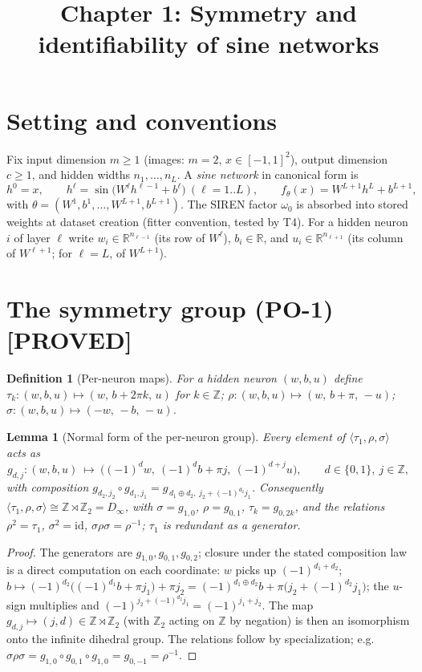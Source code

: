 \documentclass[11pt]{article}
\title{Chapter 1: Symmetry and identifiability of sine networks}
\newtheorem{lemma}[theorem]{Lemma}
\newtheorem{definition}[theorem]{Definition}
\newcommand{\R}{\mathbb{R}}
\newcommand{\Z}{\mathbb{Z}}
\newcommand{\Dinf}{D_\infty}
\begin{document}
\maketitle

\section{Setting and conventions}\label{sec:setting}

Fix input dimension $m\ge 1$ (images: $m=2$, $x\in[-1,1]^2$), output dimension $c\ge 1$, and
hidden widths $n_1,\dots,n_L$. A \emph{sine network} in canonical form is
\[
h^0 = x,\qquad h^\ell = \sin\!\big(W^\ell h^{\ell-1} + b^\ell\big)\ (\ell=1..L),\qquad
f_\theta(x) = W^{L+1} h^L + b^{L+1},
\]
with $\theta=(W^1,b^1,\dots,W^{L+1},b^{L+1})$. The SIREN factor $\omega_0$ is absorbed into stored
weights at dataset creation (fitter convention, tested by T4). For a hidden neuron $i$ of layer
$\ell$ write $w_i\in\R^{n_{\ell-1}}$ (its row of $W^\ell$), $b_i\in\R$, and $u_i\in\R^{n_{\ell+1}}$
(its column of $W^{\ell+1}$; for $\ell=L$, of $W^{L+1}$).

\section{The symmetry group (PO-1) [PROVED]}

\begin{definition}[Per-neuron maps]\label{def:generators}
For a hidden neuron $(w,b,u)$ define
$\tau_k:(w,b,u)\mapsto(w,\,b+2\pi k,\,u)$ for $k \in \Z$;\quad
$\rho:(w,b,u)\mapsto(w,\,b+\pi,\,-u)$;\quad
$\sigma:(w,b,u)\mapsto(-w,\,-b,\,-u)$.
\end{definition}

\begin{lemma}[Normal form of the per-neuron group]\label{lem:normalform}
Every element of $\langle \tau_1,\rho,\sigma\rangle$ acts as
\[
g_{d,j}\colon (w,b,u)\ \mapsto\ \big((-1)^d w,\ (-1)^d b + \pi j,\ (-1)^{d+j} u\big),
\qquad d\in\{0,1\},\ j\in\Z ,
\]
with composition $g_{d_2,j_2}\circ g_{d_1,j_1} = g_{\,d_1\oplus d_2,\ j_2+(-1)^{d_2} j_1}$.
Consequently $\langle \tau_1,\rho,\sigma\rangle \cong \Z\rtimes\Z_2 = \Dinf$, with
$\sigma=g_{1,0}$, $\rho=g_{0,1}$, $\tau_k=g_{0,2k}$, and the relations
$\rho^2=\tau_1$, $\sigma^2=\mathrm{id}$, $\sigma\rho\sigma=\rho^{-1}$; $\tau_1$ is redundant as a
generator.
\end{lemma}

\begin{proof}
The generators are $g_{1,0},g_{0,1},g_{0,2}$; closure under the stated composition law is a direct
computation on each coordinate: $w$ picks up $(-1)^{d_1+d_2}$; $b\mapsto
(-1)^{d_2}\!\big((-1)^{d_1}b+\pi j_1\big)+\pi j_2=(-1)^{d_1\oplus d_2}b+\pi\big(j_2+(-1)^{d_2}j_1\big)$;
the $u$-sign multiplies and $(-1)^{j_2+(-1)^{d_2}j_1}=(-1)^{j_1+j_2}$. The map
$g_{d,j}\mapsto (j,d)\in\Z\rtimes\Z_2$ (with $\Z_2$ acting on $\Z$ by negation) is then an
isomorphism onto the infinite dihedral group. The relations follow by specialization; e.g.
$\sigma\rho\sigma= g_{1,0}\circ g_{0,1}\circ g_{1,0}=g_{0,-1}=\rho^{-1}$.
\end{proof}
\end{document}
